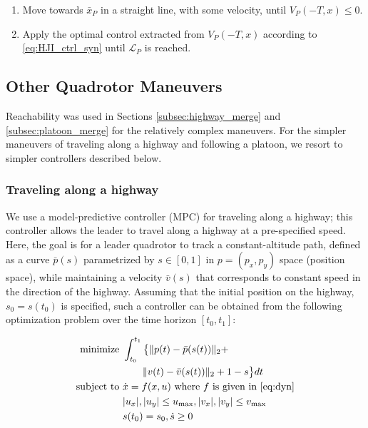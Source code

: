 \begin{enumerate}
\item Move towards $\bar{x}_P$ in a straight line, with some velocity, until $V_P(-T,x)\le 0$.
\item Apply the optimal control extracted from $V_P(-T,x)$ according to \eqref{eq:HJI_ctrl_syn} until $\mathcal{L}_P$ is reached.
\end{enumerate}

\subsection{Other Quadrotor Maneuvers}
Reachability was used in Sections \ref{subsec:highway_merge} and \ref{subsec:platoon_merge} for the relatively complex maneuvers. For the simpler maneuvers of traveling along a highway and following a platoon, we resort to simpler controllers described below.

\subsubsection{Traveling along a highway} \label{sec:travel_hwy}
We use a model-predictive controller (MPC) for traveling along a highway; this controller allows the leader to travel along a highway at a pre-specified speed. Here, the goal is for a leader quadrotor to track a constant-altitude path, defined as a curve $\bar{p}(s)$ parametrized by $s\in[0,1]$ in $p=(p_x, p_y)$ space (position space), while maintaining a velocity $\bar{v}(s)$ that corresponds to constant speed in the direction of the highway. Assuming that the initial position on the highway, $s_0=s(t_0)$ is specified, such a controller can be obtained from the following optimization problem over the time horizon $[t_0, t_1]$:

\begin{equation}
\begin{aligned}
\text{minimize } & \int_{t_0}^{t_1} \big\{\| p(t)-\bar{p}(s(t)) \|_2 + \\ 
&\qquad \| v(t) - \bar{v}(s(t)) \|_2 + 1-s \big\} dt \\
\text{subject to } & \dot{x} = f(x,u) \text{ where } f \text{ is given in \eqref{eq:dyn}} \\
& |u_x|, |u_y| \le u_\text{max}, |v_x|, |v_y| \le v_\text{max} \\
& s(t_0) = s_0, \dot{s} \ge 0
\end{aligned}
\end{equation}

